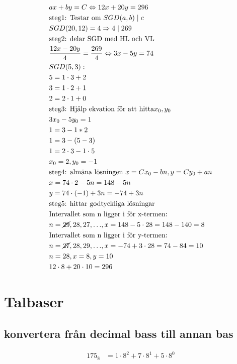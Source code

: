 \begin{multicols}{2}
\begin{align*}
  &ax + by = C \Leftrightarrow 12x + 20y = 296 \\
  &\text{steg1: Testar om } SGD(a,b) \mid c \\
  &SGD(20,12) = 4 \Rightarrow 4 \mid 269 \\
  &\text{steg2: delar SGD med HL och VL} \\
  &\frac{12x - 20y}{4} = \frac{269}{4} \Leftrightarrow 3x - 5y = 74 \\
  &SGD(5,3): \\
  &5 = 1 \cdot 3 + 2 \\
  &3 = 1 \cdot 2 + 1 \\
  &2 = 2 \cdot 1 + 0 \\
  &\text{steg3: Hjälp ekvation för att hitta} x_0, y_0 \\
  &3x_0 - 5y_0 = 1 \\
  &1 = 3 - 1 * 2 \\
  &1 = 3 - (5 - 3) \\
  &1 = 2 \cdot 3 - 1 \cdot 5 \\
  &x_0 = 2, y_0 = -1 \\
  &\text{steg4: almäna lösningen } x = Cx_0 - bn, y = Cy_0 + an \\
  &x = 74 \cdot 2 - 5n = 148 - 5n \\
  &y = 74 \cdot (-1) + 3n = -74 + 3n \\
  &\text{steg5: hittar godtyckliga lösningar} \\
  &\text{Intervallet som n ligger i för x-termen:} \\
  &n = {\cancel{29}, 28, 27, \ldots }, x = 148 - 5 \cdot 28 = 148 - 140 = 8 \\ 
  &\text{Intervallet som n ligger i för y-termen:} \\
  &n = {\cancel{27}, 28, 29, \ldots }, x = -74 + 3 \cdot 28 = 74 - 84 = 10 \\
  &n = 28, x=8, y=10 \\
  &12 \cdot 8 + 20 \cdot 10 = 296 \\
\end{align*}


\section{Talbaser}
\subsection{konvertera från decimal bass till annan bas}
\begin{align*}
  175_8 &= 1 \cdot 8^2 + 7 \cdot 8^1 + 5 \cdot 8^0 \\
\end{align*}


\end{multicols}
